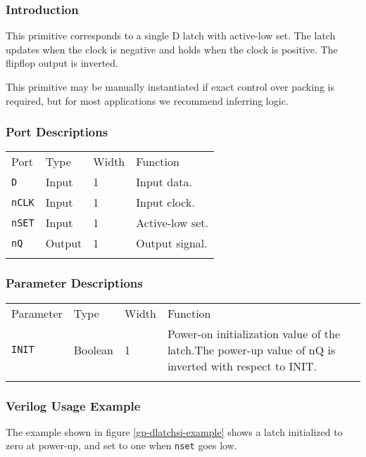 \documentclass[11pt]{article}
\newcommand{\tokenstyle}[1]{\texttt{#1}}
\newcommand{\wirestyle}[1]{\texttt{#1}}
\newcommand{\whenstyle}[1]{{\fontseries{sb}\selectfont#1}}
\newcommand{\thinhline}{\Xhline{1\arrayrulewidth}}
\newcommand{\thickhline}{\Xhline{2.5\arrayrulewidth}}
\begin{document}
\subsubsection{Introduction}
This primitive corresponds to a single D latch with active-low set. The latch updates when the clock is negative and holds
when the clock is positive. The flipflop output is inverted.

This primitive may be manually instantiated if exact control over packing is required, but for most applications we
recommend inferring logic.

\subsubsection{Port Descriptions}

\begin{tabularx}{\textwidth}{lllX}
\thinhline
\whenstyle{Port} & \whenstyle{Type} & \whenstyle{Width} & \whenstyle{Function} \\
\thickhline
\tokenstyle{D} & Input & 1 & Input data. \\
\thinhline
\tokenstyle{nCLK} & Input & 1 & Input clock. \\
\thinhline
\tokenstyle{nSET} & Input & 1 & Active-low set. \\
\thinhline
\tokenstyle{nQ} & Output & 1 & Output signal. \\
\thinhline
\end{tabularx}

\subsubsection{Parameter Descriptions}

\begin{tabularx}{\textwidth}{lllX}
\thinhline
\whenstyle{Parameter} & \whenstyle{Type} & \whenstyle{Width} & \whenstyle{Function} \\
\thickhline
\tokenstyle{INIT} & Boolean & 1 & Power-on initialization value of the latch.\newline The power-up value of nQ is
inverted with respect to INIT.\\
\thinhline
\end{tabularx}

\subsubsection{Verilog Usage Example}

The example shown in figure \ref{gp-dlatchsi-example} shows a latch initialized to zero at power-up, and set to one
when \wirestyle{nset} goes low.
\end{document}
